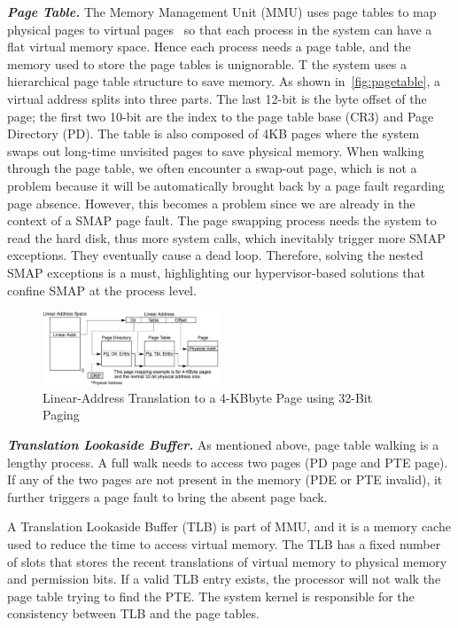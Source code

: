 \textbf{\textit{Page Table.}} The Memory Management Unit (MMU) uses page tables to map physical pages to virtual pages~\cite{intelpaging} so that each process in the system can have a flat virtual memory space. Hence each process needs a page table, and the memory used to store the page tables is unignorable. T the system uses a hierarchical page table structure to save memory. As shown in~\autoref{fig:pagetable}, a virtual address splits into three parts. The last 12-bit is the byte offset of the page;  the first two 10-bit are the index to the page table base (CR3) and Page Directory (PD). The table is also composed of 4KB pages where the system swaps out long-time unvisited pages to save physical memory. When walking through the page table, we often encounter a swap-out page, which is not a problem because it will be automatically brought back by a page fault regarding page absence. However, this becomes a problem since we are already in the context of a SMAP page fault. The page swapping process needs the system to read the hard disk, thus more system calls, which inevitably trigger more SMAP exceptions. They eventually cause a dead loop.  Therefore, solving the nested SMAP exceptions is a must, highlighting our hypervisor-based solutions that confine SMAP at the process level.

\begin{figure}[th]
  \includegraphics[width=0.47\textwidth]{figures/pagetable}
  \centering
  \caption{Linear-Address Translation to a 4-KBbyte Page using 32-Bit Paging~\cite{intelpaging}}
  \label{fig:pagetable}
\end{figure}


\textbf{\textit{Translation Lookaside Buffer.}} As mentioned above, page table walking is a lengthy process. A full walk needs to access two pages (PD page and PTE page). If any of the two pages are not present in the memory (PDE or PTE invalid), it further triggers a page fault to bring the absent page back.

A Translation Lookaside Buffer (TLB) is part of MMU, and it is a memory cache used to reduce the time to access virtual memory. The TLB has a fixed number of slots that stores the recent translations of virtual memory to physical memory and permission bits. If a valid TLB entry exists, the processor will not walk the page table trying to find the PTE. The system kernel is responsible for the consistency between TLB and the page tables.


